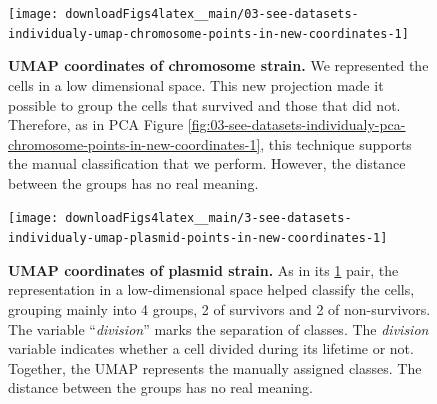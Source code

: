 \documentclass[a4paper, nobind]{templates/ociamthesis}
\begin{document}
\begin{figure}[H]
\texttt{[image: downloadFigs4latex\_\_main/03-see-datasets-individualy-umap-chromosome-points-in-new-coordinates-1]} \caption[UMAP coordinates of chromosome strain.]{\textbf{UMAP coordinates of chromosome strain.} We represented the cells in a low dimensional space. This new projection made it possible to group the cells that survived and those that did not. Therefore, as in PCA Figure \ref{fig:03-see-datasets-individualy-pca-chromosome-points-in-new-coordinates-1}, this technique supports the manual classification that we perform. However, the distance between the groups has no real meaning.}\label{fig:03-see-datasets-individualy-umap-chromosome-points-in-new-coordinates-1}
\end{figure}





\begin{figure}[H]
\texttt{[image: downloadFigs4latex\_\_main/3-see-datasets-individualy-umap-plasmid-points-in-new-coordinates-1]} \caption[UMAP coordinates of plasmid strain.]{\textbf{UMAP coordinates of plasmid strain.} As in its \ref{fig:03-see-datasets-individualy-umap-chromosome-points-in-new-coordinates-1} pair, the representation in a low-dimensional space helped classify the cells, grouping mainly into 4 groups, 2 of survivors and 2 of non-survivors. The variable ``\emph{division}'' marks the separation of classes. The \emph{division} variable indicates whether a cell divided during its lifetime or not. Together, the UMAP represents the manually assigned classes. The distance between the groups has no real meaning.}\label{fig:3-see-datasets-individualy-umap-plasmid-points-in-new-coordinates-1}
\end{figure}
\end{document}
